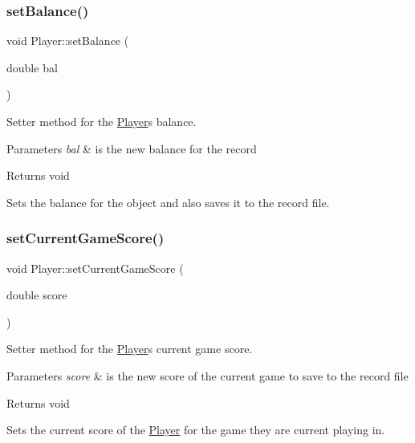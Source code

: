 \subsubsection{\texorpdfstring{set\+Balance()}{setBalance()}}
{\footnotesize\ttfamily void Player\+::set\+Balance (\begin{DoxyParamCaption}\item[{double}]{bal }\end{DoxyParamCaption})}



Setter method for the \hyperlink{classPlayer}{Player}\textquotesingle{}s balance. 


\begin{DoxyParams}{Parameters}
{\em bal} & is the new balance for the record \\
\hline
\end{DoxyParams}
\begin{DoxyReturn}{Returns}
void
\end{DoxyReturn}
Sets the balance for the object and also saves it to the record file. \mbox{\label{classPlayer_a1b2af56d4beb6e7a7961b3b572b42bdb}} 
\subsubsection{\texorpdfstring{set\+Current\+Game\+Score()}{setCurrentGameScore()}}
{\footnotesize\ttfamily void Player\+::set\+Current\+Game\+Score (\begin{DoxyParamCaption}\item[{double}]{score }\end{DoxyParamCaption})}



Setter method for the \hyperlink{classPlayer}{Player}\textquotesingle{}s current game score. 


\begin{DoxyParams}{Parameters}
{\em score} & is the new score of the current game to save to the record file \\
\hline
\end{DoxyParams}
\begin{DoxyReturn}{Returns}
void
\end{DoxyReturn}
Sets the current score of the \hyperlink{classPlayer}{Player} for the game they are current playing in. \mbox{\label{classPlayer_a8a4e0a62953bad66dd6dd18f28619ead}} 
